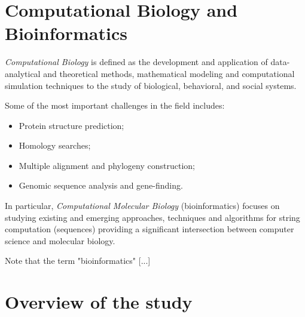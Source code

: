 \section{Computational Biology and Bioinformatics} 
 
\textit{Computational Biology} is defined as the development and application of data-analytical and theoretical methods, mathematical modeling and computational simulation techniques to the study of biological, behavioral, and social systems\cite{nihdef}.

Some of the most important challenges in the field includes\cite{2}:
\begin{itemize}
\item Protein structure prediction;
\item Homology searches;
\item Multiple alignment and phylogeny construction;
\item Genomic sequence analysis and gene-finding.
\end{itemize}

In particular, \textit{Computational Molecular Biology} (bioinformatics) focuses on studying existing and emerging approaches, techniques and algorithms for string computation (sequences) providing a significant intersection between computer science and molecular biology.

Note that the term "bioinformatics" [...]
\section{Overview of the study} 
